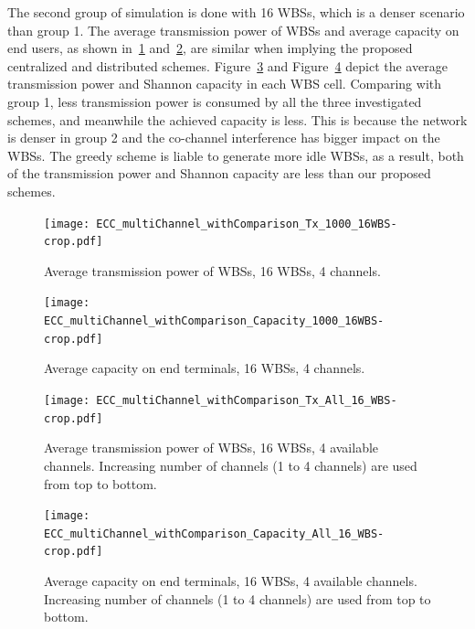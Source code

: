 \documentclass[times]{ettauth}
\theoremstyle{mytheoremstyle}
\theoremstyle{mytheoremstyle}
\theoremstyle{mytheoremstyle}
\begin{document}
The second group of simulation is done with 16 WBSs, which is a denser scenario than group 1. 
The average transmission power of WBSs and average capacity on end users, as shown in~\ref{transPower2} and~\ref{ECC_multiChannel_Capacity2}, are similar when implying the proposed centralized and distributed schemes.
Figure~\ref{transPower2_each_cell} and Figure~\ref{ECC_multiChannel_Capacity2_each_cell} depict the average transmission power and Shannon capacity in each WBS cell.
Comparing with group 1, less transmission power is consumed by all the three investigated schemes, and meanwhile the achieved capacity is less.
This is because the network is denser in group 2 and the co-channel interference has bigger impact on the WBSs.
The greedy scheme is liable to generate more idle WBSs, as a result, both of the transmission power and Shannon capacity are less than our proposed schemes.


 \begin{figure}[h!]
    \centering
      \texttt{[image: ECC\_multiChannel\_withComparison\_Tx\_1000\_16WBS-crop.pdf]}
    \caption{Average transmission power of WBSs,  16 WBSs, 4 channels.}
\label{transPower2}    
  \end{figure}
  
       \begin{figure}[h!]
       \centering
       \texttt{[image: ECC\_multiChannel\_withComparison\_Capacity\_1000\_16WBS-crop.pdf]}
       \caption{Average capacity on end terminals,  16 WBSs, 4 channels.}
	\label{ECC_multiChannel_Capacity2}
     \end{figure}
 \begin{figure}[h!]
    \centering
      \texttt{[image: ECC\_multiChannel\_withComparison\_Tx\_All\_16\_WBS-crop.pdf]}
    \caption{Average transmission power of WBSs,  16 WBSs, 4 available channels. Increasing number of channels (1 to 4 channels) are used from top to bottom.}
\label{transPower2_each_cell}    
  \end{figure}
  
       \begin{figure}[h!]
       \centering
       \texttt{[image: ECC\_multiChannel\_withComparison\_Capacity\_All\_16\_WBS-crop.pdf]}
       \caption{Average capacity on end terminals,  16 WBSs, 4 available channels. Increasing number of channels (1 to 4 channels) are used from top to bottom.}
	\label{ECC_multiChannel_Capacity2_each_cell}
     \end{figure}
\end{document}
